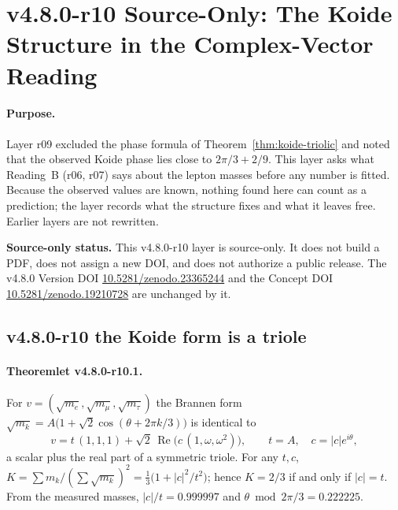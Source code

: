 
\clearpage
\section*{v4.8.0-r10 Source-Only: The Koide Structure in the Complex-Vector Reading}
\label{sec:v480-r10-koide-reading-b}

\paragraph{Purpose.}
Layer r09 excluded the phase formula of Theorem~\ref{thm:koide-triolic} and noted that the observed
Koide phase lies close to \(2\pi/3+2/9\).  This layer asks what Reading~B (r06, r07) says about the
lepton masses before any number is fitted.  Because the observed values are known, nothing found here
can count as a prediction; the layer records what the structure fixes and what it leaves free.
Earlier layers are not rewritten.

\noindent\textbf{Source-only status.}
This v4.8.0-r10 layer is source-only.  It does not build a PDF, does not assign a new DOI,
and does not authorize a public release.  The v4.8.0 Version DOI
\href{https://doi.org/10.5281/zenodo.23365244}{10.5281/zenodo.23365244} and the Concept DOI
\href{https://doi.org/10.5281/zenodo.19210728}{10.5281/zenodo.19210728} are unchanged by it.

\subsection*{v4.8.0-r10 the Koide form is a triole}
\label{subsec:v480-r10-koide-triole}

\paragraph{Theoremlet v4.8.0-r10.1.}
For \(v=(\sqrt{m_e},\sqrt{m_\mu},\sqrt{m_\tau})\) the Brannen form
\(\sqrt{m_k}=A\bigl(1+\sqrt2\cos(\theta+2\pi k/3)\bigr)\) is identical to
\[
v=t\,(1,1,1)+\sqrt2\,\operatorname{Re}\bigl(c\,(1,\omega,\omega^2)\bigr),\qquad
t=A,\quad c=|c|e^{i\theta},
\]
a scalar plus the real part of a symmetric triole.  For any \(t,c\),
\(K=\sum m_k/(\sum\sqrt{m_k})^2=\tfrac13\bigl(1+|c|^2/t^2\bigr)\); hence \(K=2/3\) if and only if
\(|c|=t\).  From the measured masses, \(|c|/t=0.999997\) and \(\theta\bmod 2\pi/3=0.222225\).

